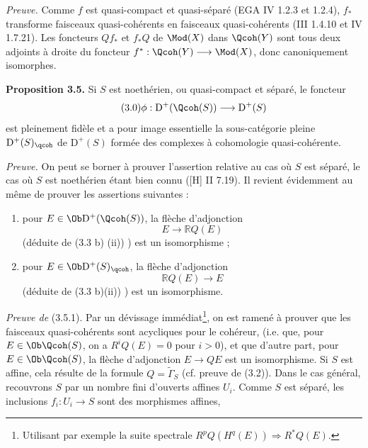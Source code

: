 \emph{Preuve.} Comme $f$ est quasi-compact et quasi-séparé (EGA IV 1.2.3 et 1.2.4), $f_*$ transforme faisceaux quasi-cohérents en faisceaux quasi-cohérents (III 1.4.10 et IV 1.7.21). Les foncteurs $Qf_*$ et $f_*Q$ de $\Mod(X)$ dans $\Qcoh(Y)$ sont tous deux adjoints à droite du foncteur $f^*:\Qcoh(Y)\longrightarrow\Mod(X)$, donc canoniquement isomorphes.

\textbf{Proposition 3.5.} Si $S$ est noethérien, ou quasi-compact et séparé, le foncteur
\begin{equation}\tag{3.0}
 \phi:\mathrm D^+(\Qcoh(S))\longrightarrow \mathrm D^+(S)
\end{equation}
est pleinement fidèle et a pour image essentielle la sous-catégorie pleine $\mathrm D^+(S)_{\qcoh}$ de $\mathrm D^+(S)$ formée des complexes à cohomologie quasi-cohérente.

\emph{Preuve.} On peut se borner à prouver l'assertion relative au cas où $S$ est séparé, le cas où $S$ est noethérien étant bien connu ([H] II 7.19). Il revient évidemment au même de prouver les assertions suivantes :

\begin{enumerate}[label={(3.5.\arabic*)~:}]
\item pour $E\in\Ob\mathrm D^+(\Qcoh(S))$, la flèche d'adjonction
\[
 E\longrightarrow \mathbb RQ(E)
\]
(déduite de (3.3 b) (ii)) ) est un isomorphisme ;
\item pour $E\in\Ob\mathrm D^+(S)_{\qcoh}$, la flèche d'adjonction
\[
 \mathbb RQ(E)\longrightarrow E
\]
(déduite de (3.3 b)(ii)) ) est un isomorphisme.
\end{enumerate}

\emph{Preuve de} (3.5.1). Par un dévissage immédiat\footnote{Utilisant par exemple la suite spectrale $R^pQ(H^q(E))\Longrightarrow R^{*}Q(E)$.}, on est ramené à prouver que les faisceaux quasi-cohérents sont acycliques pour le cohéreur, (i.e. que, pour $E\in\Ob\Qcoh(S)$, on a $R^iQ(E)=0$ pour $i>0$), et que d'autre part, pour $E\in\Ob\Qcoh(S)$, la flèche d'adjonction $E\longrightarrow QE$ est un isomorphisme. Si $S$ est affine, cela résulte de la formule $Q=\widetilde{\Gamma}_S$ (cf. preuve de (3.2)). Dans le cas général, recouvrons $S$ par un nombre fini d'ouverts affines $U_i$. Comme $S$ est séparé, les inclusions $f_i:U_i\longrightarrow S$ sont des morphismes affines, 
